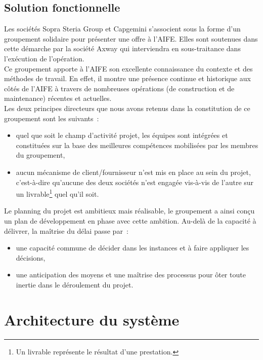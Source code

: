\documentclass[12pt,a4paper]{article}
\begin{document}
\subsection{Solution fonctionnelle}
Les sociétés Sopra Steria Group et Capgemini s’associent sous la forme d’un groupement solidaire pour présenter une offre à l’AIFE. Elles sont soutenues dans cette démarche par la société Axway qui interviendra en sous-traitance dans l’exécution de l’opération.\\
Ce groupement apporte à l’AIFE son excellente connaissance du contexte et des méthodes de travail. En effet, il montre une présence continue et historique aux côtés de l’AIFE à travers de nombreuses opérations (de construction et de maintenance) récentes et actuelles.\\
Les deux principes directeurs que nous avons retenus dans la constitution de ce groupement sont les suivants~:
\begin{itemize}
\item quel que soit le champ d’activité projet, les équipes sont intégrées et constituées sur la base des meilleures compétences mobilisées par les membres du groupement,
\item aucun mécanisme de client/fournisseur n’est mis en place au sein du projet, c’est-à-dire qu’aucune des deux sociétés n’est engagée vis-à-vis de l’autre sur un livrable\footnote{Un livrable représente le résultat d'une prestation.} quel qu’il soit.
\end{itemize}
Le planning du projet est ambitieux mais réalisable, le groupement a ainsi conçu un plan de développement en phase avec cette ambition. Au-delà de la capacité à délivrer, la maîtrise du délai passe par~:
\begin{itemize}
\item une capacité commune de décider dans les instances et à faire appliquer les décisions,
\item une anticipation des moyens et une maîtrise des processus pour ôter toute inertie dans le déroulement du projet.
\end{itemize}
\newpage
\clearpage
\section{Architecture du système}
\end{document}
